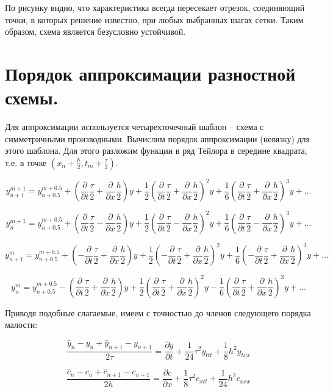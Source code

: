 \documentclass[a4paper,14pt]{article}
\begin{document}
По рисунку видно, что характеристика всегда пересекает отрезок, соединяющий точки, в которых решение известно, при любых выбранных шагах сетки. Таким образом, схема является безусловно устойчивой.

\section{Порядок аппроксимации разностной схемы.}
Для аппроксимации используется четырехточечный шаблон – схема с симметричными производными. Вычислим порядок аппроксимации (невязку) для этого шаблона.
Для этого разложим функции в ряд Тейлора в середине квадрата, т.е. в точке $(x_n + \frac{h}{2}, t_m + \frac{\tau}{2})$.

$$y_{n+1}^{m+1} = y_{n+0.5}^{m + 0.5} + (\frac{\partial}{\partial t}\frac{\tau}{2}+\frac{\partial}{\partial x}\frac{h}{2})y+
\frac{1}{2}(\frac{\partial}{\partial t}\frac{\tau}{2}+\frac{\partial }{\partial x}\frac{h}{2})^2 y + 
\frac{1}{6}(\frac{\partial}{\partial t}\frac{\tau}{2}+\frac{\partial}{\partial x}\frac{h}{2})^3 y +...$$

$$y_{n}^{m+1} = y_{n+0.5}^{m + 0.5} + (\frac{\partial}{\partial t}\frac{\tau}{2}-\frac{\partial}{\partial x}\frac{h}{2})y+
\frac{1}{2}(\frac{\partial}{\partial t}\frac{\tau}{2}-\frac{\partial }{\partial x}\frac{h}{2})^2 y + 
\frac{1}{6}(\frac{\partial}{\partial t}\frac{\tau}{2}-\frac{\partial}{\partial x}\frac{h}{2})^3 y +...$$

$$y_{n+1}^{m} = y_{n+0.5}^{m + 0.5} + (-\frac{\partial}{\partial t}\frac{\tau}{2}+\frac{\partial}{\partial x}\frac{h}{2})y+
\frac{1}{2}(-\frac{\partial}{\partial t}\frac{\tau}{2}+\frac{\partial }{\partial x}\frac{h}{2})^2 y + 
\frac{1}{6}(-\frac{\partial}{\partial t}\frac{\tau}{2}+\frac{\partial}{\partial x}\frac{h}{2})^3 y +...$$

$$y_{n}^{m} = y_{n+0.5}^{m + 0.5} - (\frac{\partial}{\partial t}\frac{\tau}{2}+\frac{\partial}{\partial x}\frac{h}{2})y+
\frac{1}{2}(\frac{\partial}{\partial t}\frac{\tau}{2}+\frac{\partial }{\partial x}\frac{h}{2})^2 y - 
\frac{1}{6}(\frac{\partial}{\partial t}\frac{\tau}{2}+\frac{\partial}{\partial x}\frac{h}{2})^3 y +...$$


Приводя подобные слагаемые, имеем с точностью до членов следующего порядка малости:

$$\frac{\hat{y}_n-y_n+\hat{y}_{n+1}-y_{n+1}}{2 \tau} = \frac{\partial y}{\partial t} + \frac{1}{24}\tau^2 y_{ttt} + \frac{1}{8} h^2 y_{txx}$$


$$\frac{\hat{c}_n-c_n+\hat{c}_{n+1}-c_{n+1}}{2 h} = \frac{\partial c}{\partial x} + \frac{1}{8} \tau^2  c_{xtt} + \frac{1}{24} h^2 c_{xxx}$$
\end{document}
